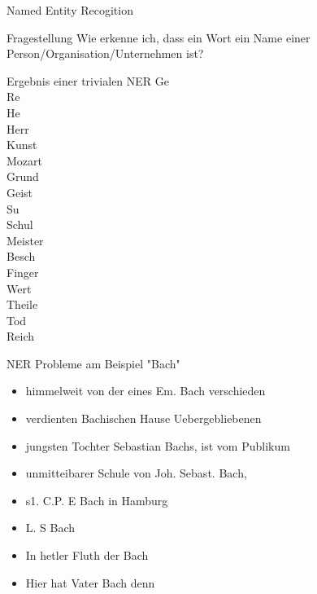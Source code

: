 \documentclass{beamer}
\begin{document}
\begin{frame}{Named Entity Recogition}
	\begin{block}{Fragestellung}
		Wie erkenne ich, dass ein Wort ein Name einer Person/Organisation/Unternehmen ist?
	\end{block}

\end{frame}
\begin{frame}{Ergebnis einer trivialen NER}
	Ge\\
	Re\\
	He\\
	Herr\\
	Kunst\\
	Mozart\\
	Grund\\
	Geist\\
	Su\\
	Schul\\
	Meister\\
	Besch\\
	Finger\\
	Wert\\
	Theile\\
	Tod\\
	Reich\\
\end{frame}
\begin{frame}{NER Probleme am Beispiel "Bach"}
	\begin{itemize}
		\item \glqq himmelweit von der eines Em. Bach verschieden\grqq
		\item \glqq verdienten Bachischen Hause Uebergebliebenen\grqq
		\item \glqq jungsten Tochter Sebastian Bachs, ist vom Publikum\grqq
		\item \glqq unmitteibarer Schule von Joh. Sebast. Bach,\grqq
		\item \glqq s1. C.P. E Bach in Hamburg\grqq
		\item \glqq L. S Bach\grqq
		\item \glqq  In hetler Fluth der Bach\grqq
		\item \glqq Hier hat Vater Bach denn\grqq
	\end{itemize}
\end{frame}
\end{document}
